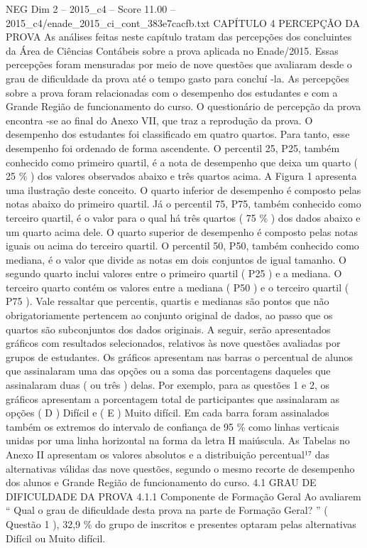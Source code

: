 \begin{textsample}{NEG Dim 2 – 2015\_c4 – Score 11.00 – 2015\_c4/enade\_2015\_ci\_cont\_383e7cacfb.txt}  \label{ex:f2_neg_354}
CAPÍTULO 4 PERCEPÇÃO DA PROVA As análises feitas neste capítulo tratam das percepções dos concluintes da Área de Ciências Contábeis sobre a prova aplicada no Enade/2015.
Essas percepções foram mensuradas por meio de nove questões que avaliaram desde o grau de dificuldade da prova até o tempo gasto para concluí -la.
As percepções sobre a prova foram relacionadas com o desempenho dos estudantes e com a Grande Região de funcionamento do curso.
O questionário de percepção da prova encontra -se ao final do Anexo VII, que traz a reprodução da prova.
O desempenho dos estudantes foi classificado em quatro quartos.
Para tanto, esse desempenho foi ordenado de forma ascendente.
O percentil 25, P25, também conhecido como primeiro quartil, é a nota de desempenho que deixa um quarto ( 25 \% ) dos valores observados abaixo e três quartos acima.
A Figura 1 apresenta uma ilustração deste conceito.
O quarto inferior de desempenho é composto pelas notas abaixo do primeiro quartil.
Já o percentil 75, P75, também conhecido como terceiro quartil, é o valor para o qual há três quartos ( 75 \% ) dos dados abaixo e um quarto acima dele.
O quarto superior de desempenho é composto pelas notas iguais ou acima do terceiro quartil.
O percentil 50, P50, também conhecido como mediana, é o valor que divide as notas em dois conjuntos de igual tamanho.
O segundo quarto inclui valores entre o primeiro quartil ( P25 ) e a mediana.
O terceiro quarto contém os valores entre a mediana ( P50 ) e o terceiro quartil ( P75 ).
Vale ressaltar que percentis, quartis e medianas são pontos que não obrigatoriamente pertencem ao conjunto original de dados, ao passo que os quartos são subconjuntos dos dados originais.
A seguir, serão apresentados gráficos com resultados selecionados, relativos às nove questões avaliadas por grupos de estudantes.
Os gráficos apresentam nas barras o percentual de alunos que assinalaram uma das opções ou a soma das porcentagens daqueles que assinalaram duas ( ou três ) delas.
Por exemplo, para as questões 1 e 2, os gráficos apresentam a porcentagem total de participantes que assinalaram as opções ( D ) Difícil e ( E ) Muito difícil.
Em cada barra foram assinalados também os extremos do intervalo de confiança de 95 \% como linhas verticais unidas por uma linha horizontal na forma da letra H maiúscula.
As Tabelas no Anexo II apresentam os valores absolutos e a distribuição percentual¹⁷ das alternativas válidas das nove questões, segundo o mesmo recorte de desempenho dos alunos e Grande Região de funcionamento do curso. 4.1 GRAU DE DIFICULDADE DA PROVA 4.1.1 Componente de Formação Geral Ao avaliarem “ Qual o grau de dificuldade desta prova na parte de Formação Geral? ” ( Questão 1 ), 32,9 \% do grupo de inscritos e presentes optaram pelas alternativas Difícil ou Muito difícil.

\end{textsample}
